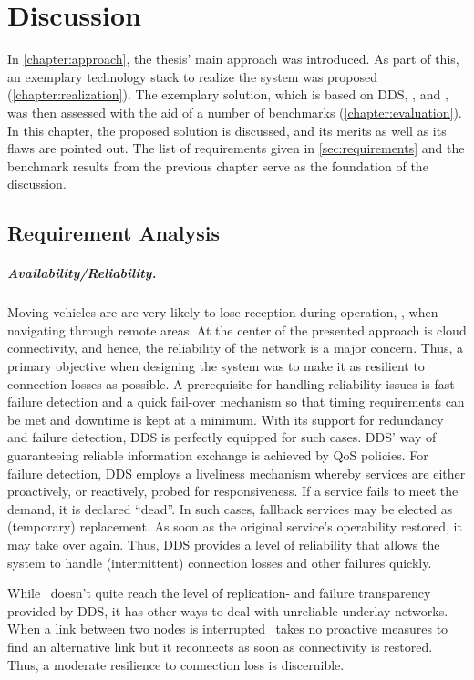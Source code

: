\chapter{Discussion}\label{chapter:discussion}
In \autoref{chapter:approach}, the thesis' main approach was introduced. As part of this, an exemplary technology stack to realize the system was proposed (\cf \autoref{chapter:realization}). The exemplary solution, which is based on DDS, \docker , and \wnet , was then assessed with the aid of a number of benchmarks (\cf \autoref{chapter:evaluation}). In this chapter, the proposed solution is discussed, and its merits as well as its flaws are pointed out. The list of requirements given in \autoref{sec:requirements} and the benchmark results from the previous chapter serve as the foundation of the discussion. 


\section{Requirement Analysis}

\paragraph{Availability/Reliability.}
Moving vehicles are are very likely to lose reception during operation, \eg , when navigating through remote areas. At the center of the presented approach is cloud connectivity, and hence, the reliability of the network is a major concern. Thus, a primary objective when designing the system was to make it as resilient to connection losses as possible. A prerequisite for handling reliability issues is fast failure detection and a quick fail-over mechanism so that timing requirements can be met and downtime is kept at a minimum. With its support for redundancy and failure detection, DDS is perfectly equipped for such cases. DDS' way of guaranteeing reliable information exchange is achieved by QoS policies. For failure detection, DDS employs a liveliness mechanism whereby services are either proactively, or reactively, probed for responsiveness. If a service fails to meet the demand, it is declared ``dead''. In such cases, fallback services may be elected as (temporary) replacement. As soon as the original service's operability restored, it may take over again. Thus, DDS provides a level of reliability that allows the system to handle (intermittent) connection losses and other failures quickly.

While \wnet\ doesn't quite reach the level of replication- and failure transparency provided by DDS, it has other ways to deal with unreliable underlay networks. When a link between two nodes is interrupted \weave\ takes no proactive measures to find an alternative link but it reconnects as soon as connectivity is restored. Thus, a moderate resilience to connection loss is discernible.

